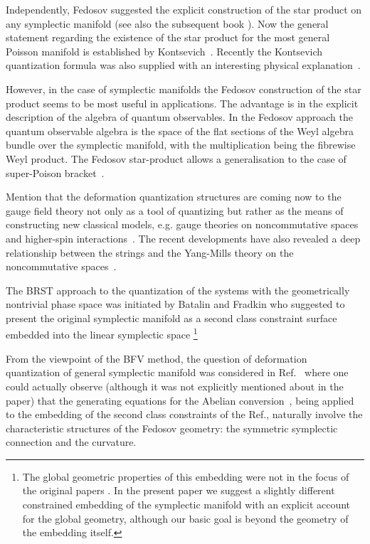 \documentclass[a4paper,11pt,oneside]{amsart}
\theoremstyle{plain}
\numberwithin{equation}{section} %
\numberwithin{figure}{section} %
\begin{document}
\noindent
Independently, Fedosov suggested the explicit construction of the
star product on any symplectic manifold \cite{[Fedosov-JDG]}
(see also the subsequent book
\cite{[Fedosov-book]}).  Now the general
statement regarding the existence of the star product for the most general
Poisson manifold is established by
Kontsevich~\cite{[Kontsevich]}.  Recently the Kontsevich
quantization formula was also supplied with an interesting physical
explanation~\cite{[Felder]}.

\noindent
However, in the case of symplectic manifolds
the Fedosov construction of the star product
seems to be most useful in applications.  The advantage
is in the explicit description of the algebra of quantum
observables.  In the Fedosov approach the quantum
observable algebra is the space of the flat sections of the Weyl
algebra bundle over the symplectic manifold, with the
multiplication being the fibrewise Weyl product.  The Fedosov
star-product allows a generalisation to the case of super-Poison
bracket~\cite{[Bord-super]}.

\noindent
Mention that the deformation quantization structures are
coming now to the gauge field theory not only as a tool
of quantizing but rather as the means of constructing
new classical models, e.g. gauge theories on
noncommutative spaces~\cite{[Connes]} and higher-spin
interactions~\cite{[Vasiliev]}.  The recent developments
have also revealed a deep relationship between the strings
and the Yang-Mills theory on the noncommutative
spaces~\cite{[SW],[CDS]}.

\noindent
The BRST approach to the quantization of the systems with the
geometrically nontrivial phase space was initiated by Batalin and
Fradkin who suggested to present the original symplectic manifold as a
second class constraint surface embedded into the linear symplectic
space \cite{[BF89]}\footnote{The global geometric properties
of this embedding were not in the focus of the original papers
\cite{[BF89],[FL],[BFF]}.  In the present paper we suggest a slightly
different constrained embedding of the symplectic manifold with an explicit
account for the global geometry, although our basic goal is beyond
the geometry of the embedding itself.}

\noindent
{}From the viewpoint of the BFV method, the question of deformation
quantization of general symplectic manifold was considered
in Ref.~\cite{[FL]} where one could actually observe (although it was not
explicitly mentioned about in the paper) that the generating equations
for the Abelian conversion~\cite{[BT]}, being applied to the
embedding of the second class constraints of the
Ref.\cite{[BF89],[BFF]}, naturally involve the characteristic
structures of the Fedosov geometry:  the symmetric symplectic
connection and the curvature.
\end{document}
